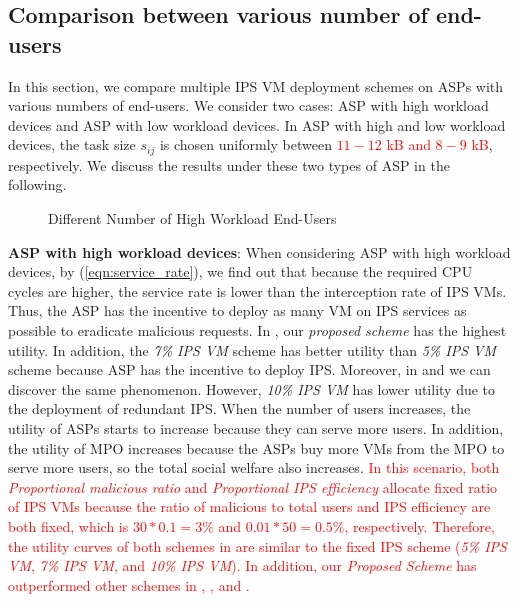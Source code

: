 \documentclass[10pt,journal, compsoc]{IEEEtran}
\begin{document}
\subsection{Comparison between various number of end-users}
In this section, we compare multiple IPS VM deployment schemes on ASPs with various numbers of end-users. We consider two cases: ASP with high workload devices and ASP with low workload devices. In ASP with high and low workload devices, the task size $s_{ij}$ is chosen uniformly between \textcolor{red}{$11 - 12$ kB and $8 - 9$ kB}, respectively. We discuss the results under these two types of ASP in the following. 
\begin{figure}[!]
\captionsetup{justification=centering}
  \hfill
  \hfill
\label{fig:num_cmp_high}
\caption{Different Number of High Workload End-Users}
\end{figure}

\textbf{ASP with high workload devices}: 
When considering ASP with high workload devices, by (\ref{eqn:service_rate}), we find out that because the required CPU cycles are higher, the service rate is lower than the interception rate of IPS VMs. Thus, the ASP has the incentive to deploy as many VM on IPS services as possible to eradicate malicious requests. In , our \textit{proposed scheme} has the highest utility. In addition, the \textit{7\% IPS VM} scheme has better utility than \textit{5\% IPS VM} scheme because ASP has the incentive to deploy IPS. Moreover, in  and  we can discover the same phenomenon. However, \textit{10\% IPS VM} has lower utility due to the deployment of redundant IPS. When the number of users increases, the utility of ASPs starts to increase because they can serve more users. In addition, the utility of MPO increases because the ASPs buy more VMs from the MPO to serve more users, so the total social welfare also increases. \textcolor{red}{In this scenario, both \textit{Proportional malicious ratio} and \textit{Proportional IPS efficiency} allocate fixed ratio of IPS VMs because the ratio of malicious to total users and IPS efficiency are both fixed, which is $30 * 0.1 = 3\%$ and $0.01 * 50 = 0.5\%$, respectively. Therefore, the utility curves of both schemes in  are similar to the fixed IPS scheme (\textit{5\% IPS VM}, \textit{7\% IPS VM}, and \textit{10\% IPS VM}). In addition, our \textit{Proposed Scheme} has outperformed other schemes in , , and .}
\end{document}
